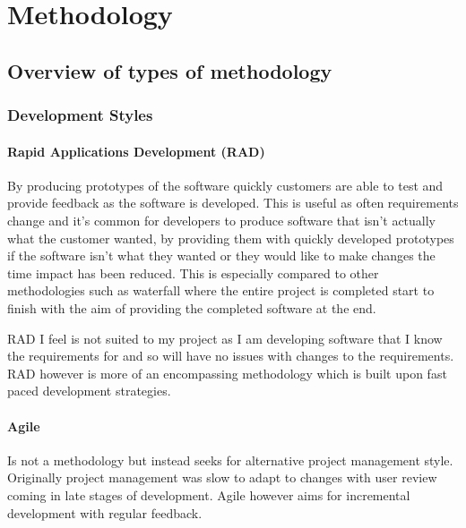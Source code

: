 \section{Methodology}\label{methodology}

\subsection{Overview of types of
methodology}\label{overview-of-types-of-methodology}

\subsubsection{Development Styles}\label{development-styles}

\paragraph{Rapid Applications Development
(RAD)}\label{rapid-applications-development-rad}

By producing prototypes of the software quickly customers are able to
test and provide feedback as the software is developed. This is useful
as often requirements change and it's common for developers to produce
software that isn't actually what the customer wanted, by providing them
with quickly developed prototypes if the software isn't what they wanted
or they would like to make changes the time impact has been reduced.
This is especially compared to other methodologies such as waterfall
where the entire project is completed start to finish with the aim of
providing the completed software at the end.

RAD I feel is not suited to my project as I am developing software that
I know the requirements for and so will have no issues with changes to
the requirements. RAD however is more of an encompassing methodology
which is built upon fast paced development strategies.

\paragraph{Agile}\label{agile}

Is not a methodology but instead seeks for alternative project
management style. Originally project management was slow to adapt to
changes with user review coming in late stages of development. Agile
however aims for incremental development with regular feedback.
\cite{agile}

